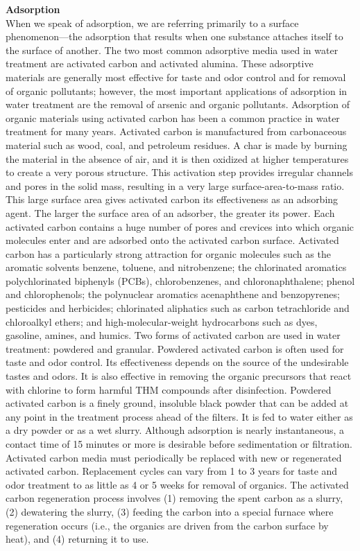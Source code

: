 \textbf{Adsorption}\\
When we speak of adsorption, we are referring primarily to a surface phenomenon—the adsorption that results when one substance attaches itself to the surface of another. The two most common adsorptive media used in water treatment are activated carbon and activated alumina. These adsorptive materials are generally most effective for taste and odor control and for removal of organic pollutants; however, the most important applications of adsorption in water treatment are the removal of arsenic and organic pollutants.
Adsorption of organic materials using activated carbon has been a common practice in water treatment for many years. Activated carbon is manufactured from carbonaceous material such as wood, coal, and petroleum residues. A char is made by burning the material in the absence of air, and it is then oxidized at higher temperatures to create a very porous structure. This activation step provides irregular channels and pores in the solid mass, resulting in a very large surface-area-to-mass ratio. This large surface area gives activated carbon its effectiveness as an adsorbing agent. The larger the surface area of an adsorber, the greater its power. Each activated carbon contains a huge number of pores and crevices into which organic molecules enter and are adsorbed onto the activated carbon surface.
Activated carbon has a particularly strong attraction for organic molecules such as the aromatic solvents benzene, toluene, and nitrobenzene; the chlorinated aromatics polychlorinated biphenyls (PCBs), chlorobenzenes, and chloronaphthalene; phenol and chlorophenols; the polynuclear aromatics acenaphthene and benzopyrenes; pesticides and herbicides; chlorinated aliphatics such as carbon tetrachloride and chloroalkyl ethers; and high-molecular-weight hydrocarbons such as dyes, gasoline, amines, and humics.
Two forms of activated carbon are used in water treatment: powdered and granular. Powdered activated carbon is often used for taste and odor control. Its effectiveness depends on the source of the undesirable tastes and odors. It is also effective in removing the organic precursors that react with chlorine to form harmful THM compounds after disinfection.
Powdered activated carbon is a finely ground, insoluble black powder that can be added at any point in the treatment process ahead of the filters. It is fed to water either as a dry powder or as a wet slurry. Although adsorption is nearly instantaneous, a contact time of 15 minutes or more is desirable before sedimentation or filtration. Activated carbon media must periodically be replaced with new or regenerated activated carbon. Replacement cycles can vary from 1 to 3 years for taste and odor treatment to as little as 4 or 5 weeks for removal of organics. The activated carbon regeneration process involves (1) removing the spent carbon as a slurry, (2) dewatering the slurry, (3) feeding the carbon into a special furnace where regeneration occurs (i.e., the organics are driven from the carbon surface by heat), and (4) returning it to use.
